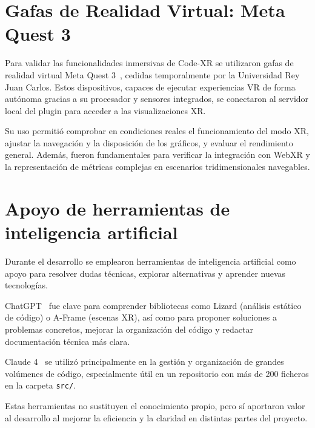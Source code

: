 \documentclass[a4paper, 12pt]{book}
\begin{document}
\section{Gafas de Realidad Virtual: Meta Quest 3}
\label{sec:meta-quest-3}

Para validar las funcionalidades inmersivas de Code-XR se utilizaron gafas de realidad virtual Meta Quest 3~\cite{metaquest3}, cedidas temporalmente por la Universidad Rey Juan Carlos. Estos dispositivos, capaces de ejecutar experiencias VR de forma autónoma gracias a su procesador y sensores integrados, se conectaron al servidor local del plugin para acceder a las visualizaciones XR.  

Su uso permitió comprobar en condiciones reales el funcionamiento del modo XR, ajustar la navegación y la disposición de los gráficos, y evaluar el rendimiento general. Además, fueron fundamentales para verificar la integración con WebXR y la representación de métricas complejas en escenarios tridimensionales navegables.


\section{Apoyo de herramientas de inteligencia artificial}
\label{sec:ia}

Durante el desarrollo se emplearon herramientas de inteligencia artificial como apoyo para resolver dudas técnicas, explorar alternativas y aprender nuevas tecnologías.  

ChatGPT~\cite{chatgpt} fue clave para comprender bibliotecas como Lizard (análisis estático de código) o A-Frame (escenas XR), así como para proponer soluciones a problemas concretos, mejorar la organización del código y redactar documentación técnica más clara.  

Claude 4~\cite{claude4} se utilizó principalmente en la gestión y organización de grandes volúmenes de código, especialmente útil en un repositorio con más de 200 ficheros en la carpeta \texttt{src/}.  

Estas herramientas no sustituyen el conocimiento propio, pero sí aportaron valor al desarrollo al mejorar la eficiencia y la claridad en distintas partes del proyecto.


\end{document}
